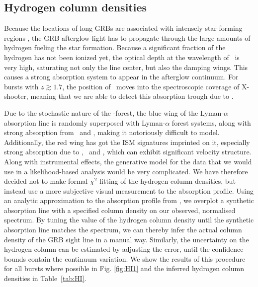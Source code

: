 \documentclass{aa}    %
\begin{document}
\subsection{Hydrogen column densities}

Because the locations of long GRBs are associated with intensely star forming regions
\citep{Hogg1999, Bloom2002, Fruchter2006}, the GRB afterglow light has to
propagate through the large amounts of hydrogen fueling the star formation.
Because a significant fraction of the hydrogen has not been ionized yet, the
optical depth at the wavelength of \lya~is very high, saturating not only the
line center, but also the damping wings. This causes a strong absorption system
to appear in the afterglow continuum. For bursts with $z \gtrsim 1.7$, the
position of \lya~moves into the spectroscopic coverage of X-shooter, meaning
that we are able to detect this absorption trough due to \lya.

Due to the stochastic nature of the \lya-forest, the blue wing of the
Lyman-$\alpha$ absorption line is randomly superposed with Lyman-$\alpha$ forest
systems, along with strong absorption from \mnii~and \SIiii, making it
notoriously difficult to model. Additionally, the red wing has got the ISM
signatures imprinted on it, especially strong absorption due to \SIii, \sii~and
\nv, which can exhibit significant velocity structure. Along with instrumental
effects, the generative model for the data that we would use in a
likelihood-based analysis would be very complicated. We have therefore decided
not to make formal $\chi^2$ fitting of the hydrogen column densities, but
instead use a more subjective visual measurement to the absorption profile. 
Using an analytic approximation to the absorption profile from
\citet{TepperGarcia2006}, we overplot a synthetic absorption line with a
specified column density on our observed, normalised spectrum. By tuning the
value of the hydrogen column density until the synthetic absorption line matches
the spectrum, we can thereby infer the actual column density of the GRB sight
line in a manual way. Similarly, the uncertainty on the hydrogen column can be
estimated by adjusting the error, until the confidence bounds contain the
continuum variation. We show the results of this procedure for all bursts where
possible in Fig. \ref{fig:HI1} and the inferred hydrogen column densities in
Table~\ref{tab:HI}.
\end{document}
